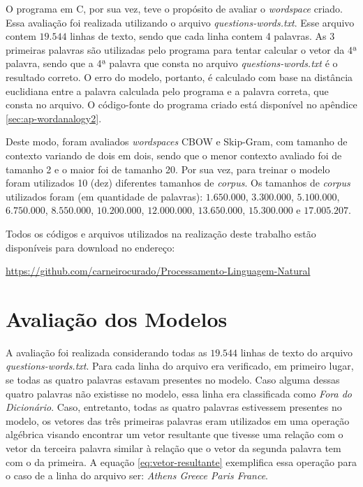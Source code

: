 \documentclass[12pt,openright,twoside,a4paper,article,brazil]{abntex2}
\begin{document}
O programa em C, por sua vez, teve o propósito de avaliar o \emph{wordspace} criado. Essa avaliação foi realizada utilizando o arquivo \emph{questions-words.txt}. Esse arquivo contem $19.544$ linhas de texto, sendo que cada linha contem 4 palavras. As 3 primeiras palavras são utilizadas pelo programa para tentar calcular o vetor da 4ª palavra, sendo que a 4ª palavra que consta no arquivo \emph{questions-words.txt} é o resultado correto. O erro do modelo, portanto, é calculado com base na distância euclidiana entre a palavra calculada pelo programa e a palavra correta, que consta no arquivo. O código-fonte do programa criado está disponível no apêndice \ref{sec:ap-wordanalogy2}.

Deste modo, foram avaliados \emph{wordspaces} CBOW e Skip-Gram, com tamanho de contexto variando de dois em dois, sendo que o menor contexto avaliado foi de tamanho 2 e o maior foi de tamanho 20. Por sua vez, para treinar o modelo foram utilizados 10 (dez) diferentes tamanhos de \emph{corpus}. Os tamanhos de \emph{corpus} utilizados foram (em quantidade de palavras): $1.650.000$, $3.300.000$, $5.100.000$, $6.750.000$, $8.550.000$, $10.200.000$, $12.000.000$, $13.650.000$, $15.300.000$ e $17.005.207$.

Todos os códigos e arquivos utilizados na realização deste trabalho estão disponíveis para download no endereço:

\url{https://github.com/carneirocurado/Processamento-Linguagem-Natural}

\section{Avaliação dos Modelos}
\label{sec:avaliacao}

A avaliação foi realizada considerando todas as $19.544$ linhas de texto do arquivo  \emph{questions-words.txt}. Para cada linha do arquivo era verificado, em primeiro lugar, se todas as quatro palavras estavam presentes no modelo. Caso alguma dessas quatro palavras não existisse no modelo, essa linha era classificada como \emph{Fora do Dicionário}. Caso, entretanto, todas as quatro palavras estivessem presentes no modelo, os vetores das três primeiras palavras eram utilizados em uma operação algébrica visando encontrar um vetor resultante que tivesse uma relação com o vetor da terceira palavra similar à relação que o vetor da segunda palavra tem com o da primeira.  A equação \ref{eq:vetor-resultante} exemplifica essa operação para o caso de a linha do arquivo ser: \emph{Athens Greece Paris France}.
\end{document}
